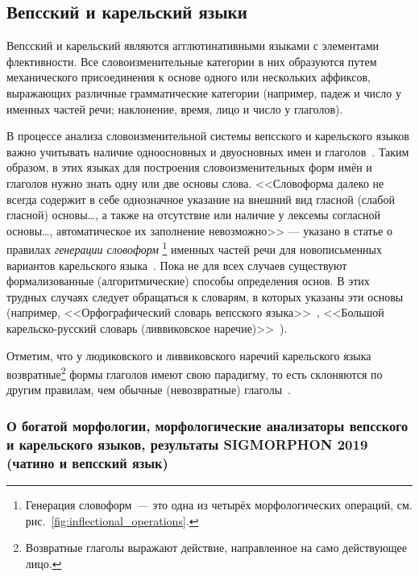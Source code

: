 \newpage


\subsection{Вепсский и карельский языки}\label{sect_review_veps_karelian}

Вепсский и карельский являются агглютинативными языками с элементами флективности. 
Все словоизменительные категории в них образуются путем механического присоединения 
к основе одного или нескольких аффиксов, выражающих различные грамматические 
категории (например, падеж и число у именных частей речи; наклонение, время, лицо и число у глаголов). 

В процессе анализа словоизменительной системы вепсского и карельского языков 
важно учитывать наличие одноосновных и двуосновных имен и глаголов~\cite[57]{KrlNovak2019PeoplesOfKarelia}.
Таким образом, в этих языках для построения словоизменительных форм имён и глаголов 
нужно знать одну или две основы слова. 
%
<<Словоформа далеко не всегда содержит в себе однозначное указание на внешний вид гласной (слабой  гласной)  основы\ldots, а также на отсутствие или наличие у лексемы согласной основы\ldots, 
автоматическое их заполнение невозможно>> --- указано в статье 
о правилах \emph{генерации словоформ}%
%
\footnote{Генерация словоформ~--- это одна из четырёх морфологических операций, 
см. рис.~\ref{fig:inflectional_operations}.} %
%
именных частей речи 
для новописьменных вариантов карельского языка~\cite[684]{rulesNominalKrl2020NovakUgricStudies}.
%
Пока не для всех случаев существуют формализованные (алгоритмические) способы определения основ. 
В этих трудных случаях следует обращаться к словарям, в которых указаны эти основы 
(например, <<Орфографический словарь вепсского языка>>~\cite{ZaitsevaNG2012OrphDict}, 
<<Большой карельско-русский словарь (ливвиковское наречие)>>~\cite{Boiko2019livvi}).

Отметим, что у людиковского и ливвиковского наречий карельского языка 
возвратные\footnote{Возвратные глаголы выражают действие, направленное на само действующее лицо.}
формы глаголов имеют свою парадигму, 
то есть склоняются по другим правилам, чем обычные (невозвратные) глаголы~\cite[268]{Novak2019Grammar}. 


\newpage

\subsubsection{О богатой морфологии, морфологические анализаторы вепсского и карельского языков, результаты SIGMORPHON 2019 (чатино и вепсский язык)}

